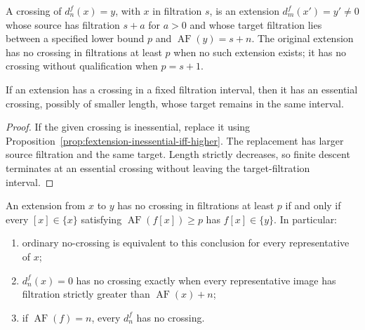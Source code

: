 

\begin{definition}
  \label{def:fess-crossing}
  \notready
  A crossing of $d_n^f(x)=y$, with $x$ in filtration $s$, is an extension
  $d_m^f(x')=y'\ne0$ whose source has filtration $s+a$ for $a>0$ and whose
  target filtration lies between a specified lower bound $p$ and
  $\operatorname{AF}(y)=s+n$.  The original extension has no crossing in
  filtrations at least $p$ when no such extension exists; it has no crossing
  without qualification when $p=s+1$.
\end{definition}

\begin{lemma}
  \label{lem:crossing-has-essential-crossing}
  \notready
  If an extension has a crossing in a fixed filtration interval, then it has
  an essential crossing, possibly of smaller length, whose target remains in
  the same interval.
\end{lemma}

\begin{proof}
  If the given crossing is inessential, replace it using
  Proposition~\ref{prop:fextension-inessential-iff-higher}.  The replacement
  has larger source filtration and the same target.  Length strictly
  decreases, so finite descent terminates at an essential crossing without
  leaving the target-filtration interval.
\end{proof}

\begin{proposition}
  \label{prop:no-crossing-iff-uniform-detection}
  \notready
  An extension from $x$ to $y$ has no crossing in filtrations at least $p$ if
  and only if every $[x]\in\{x\}$ satisfying
  $\operatorname{AF}(f[x])\ge p$ has $f[x]\in\{y\}$.  In particular:
  \begin{enumerate}
    \item ordinary no-crossing is equivalent to this conclusion for every
      representative of $x$;
    \item $d_n^f(x)=0$ has no crossing exactly when every representative image
      has filtration strictly greater than $\operatorname{AF}(x)+n$;
    \item if $\operatorname{AF}(f)=n$, every $d_n^f$ has no crossing.
  \end{enumerate}
\end{proposition}


